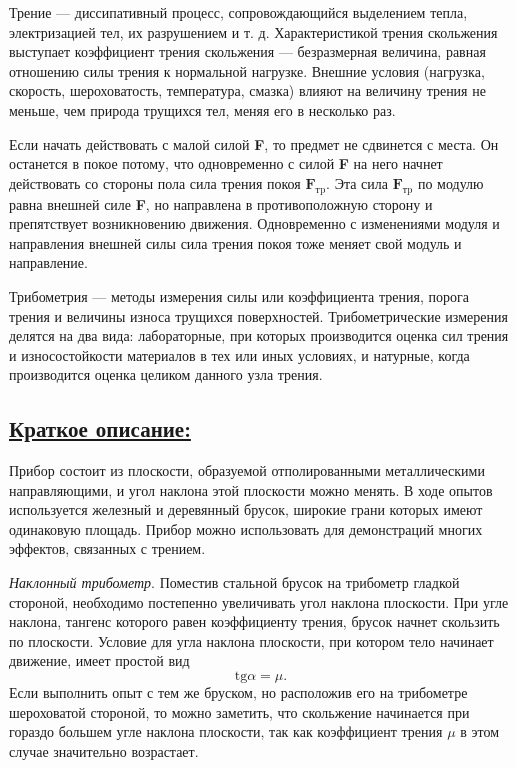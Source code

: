 \documentclass[14pt,a4paper,oneside]{extarticle}	%
\begin{document}
	Трение — диссипативный процесс, 
	сопровождающийся выделением тепла, электризацией тел, их разрушением и т. д. 
	Характеристикой трения скольжения выступает коэффициент трения 
	скольжения — безразмерная величина, равная отношению силы трения к нормальной нагрузке.
	Внешние условия (нагрузка, скорость, 
	 шероховатость, температура, смазка) влияют на величину 
	 трения не меньше, чем природа трущихся тел, меняя его в несколько раз.
	
	Если начать действовать с малой силой \textbf{F}, то предмет не сдвинется с места. 
	Он останется в покое потому, что одновременно с силой \textbf{F} на него начнет действовать со 
	стороны пола сила трения покоя $ \textbf{F}_{\text{тp}} $.
	Эта сила $ \textbf{F}_{\text{тp}} $ по модулю равна внешней силе \textbf{F}, но направлена в противоположную сторону и препятствует 	возникновению движения.
	Одновременно с изменениями модуля и направления внешней силы сила трения покоя тоже меняет свой 
	модуль и направление. 	
	
	Трибометрия — методы измерения силы или 
	коэффициента трения, порога трения и величины износа трущихся поверхностей. 
	Трибометрические измерения делятся на два вида: 
	лабораторные, при которых производится оценка сил трения и износостойкости материалов 
	в тех или иных условиях, и натурные, когда производится оценка целиком данного узла трения.

	\newpage	
	\subsection*{\underline{Краткое описание:}}
	
	Прибор состоит из плоскости, образуемой отполированными металлическими направляющими, и угол наклона этой плоскости можно менять.
	В ходе опытов используется железный и деревянный брусок, широкие грани которых имеют одинаковую площадь.
	Прибор можно использовать для демонстраций многих эффектов, связанных с трением.
	
	\textit{Наклонный трибометр}.	
	Поместив стальной брусок на трибометр гладкой стороной, необходимо постепенно увеличивать угол наклона плоскости.
	При угле наклона, тангенс которого равен коэффициенту трения, брусок начнет скользить по плоскости.
	Условие для угла наклона плоскости, при котором тело начинает движение, имеет простой вид
		 $$ \text{tg}\alpha=\mu. $$
	Если выполнить опыт с тем же бруском, но расположив его на трибометре шероховатой стороной, 
	то можно заметить, что скольжение начинается при гораздо большем угле наклона плоскости, 
	так как коэффициент трения $  \mu $ в этом случае значительно возрастает.
	
\end{document}
